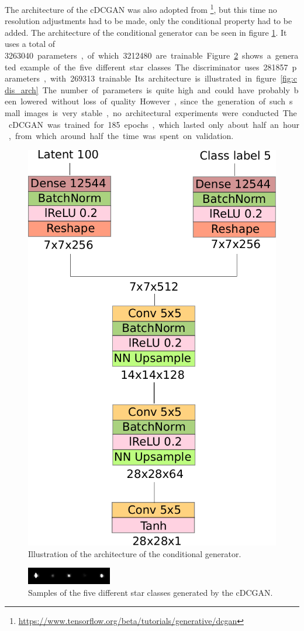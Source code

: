 \documentclass[10pt,conference,compsocconf]{IEEEtran}
\begin{document}
The architecture of the cDCGAN was also adopted from \footnote{\url{https://www.tensorflow.org/beta/tutorials/generative/dcgan}}, but this time no resolution adjustments had to be made, only the conditional property had to be added. The architecture of the conditional generator can be seen in figure \ref{fig:cgen_arch}. It uses a total of \SI{3263040} parameters, of which \SI{3212480} are trainable. Figure \ref{fig:clustered_generated_stars} shows a generated example of the five different star classes. The discriminator uses \SI{281857} parameters, with \SI{269313} trainable. Its architecture is illustrated in figure \ref{fig:cdis_arch}. The number of parameters is quite high and could have probably been lowered without loss of quality. However, since the generation of such small images is very stable, no architectural experiments were conducted. The cDCGAN was trained for 185 epochs, which lasted only about half an hour, from which around half the time was spent on validation. 
\begin{figure}
    \centering
    \includegraphics[width=0.6\columnwidth]{assets/cgen_arch.pdf}
    \caption{Illustration of the architecture of the conditional generator.}
    \label{fig:cgen_arch}
\end{figure}
\begin{figure}
    \centering
    \includegraphics[width=\columnwidth]{assets/clustered_generated_stars.png}
    \caption{Samples of the five different star classes generated by the cDCGAN.}
    \label{fig:clustered_generated_stars}
\end{figure}
\end{document}
